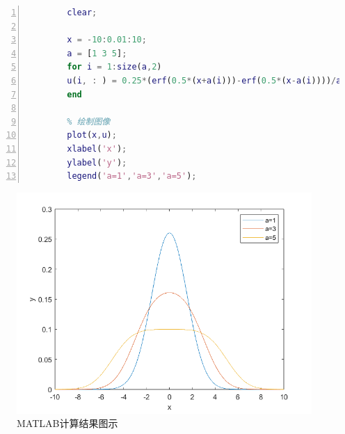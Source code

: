 \documentclass[12pt]{ctexart}
\begin{document}
    \begin{lstlisting}[language = Matlab,title={test9.m},  numbers=left, 
        numberstyle=\tiny,keywordstyle=\color{blue!70},
        commentstyle=\color{red!50!green!50!blue!50},frame=shadowbox,
        rulesepcolor=\color{red!20!green!20!blue!20},basicstyle=\ttfamily]
        % 一维无限长杆热传导问题结果图示
        clear;

        x = -10:0.01:10;
        a = [1 3 5];
        for i = 1:size(a,2)
        u(i, : ) = 0.25*(erf(0.5*(x+a(i)))-erf(0.5*(x-a(i))))/a(i);
        end

        % 绘制图像
        plot(x,u);
        xlabel('x');
        ylabel('y');
        legend('a=1','a=3','a=5');
    \end{lstlisting}
    \begin{figure}[htbp]
        \small
        \centering
        \includegraphics[width=16cm]{fig1.png}
        \caption{MATLAB计算结果图示} \label{Fig:aa}
    \end{figure}
\end{document}
